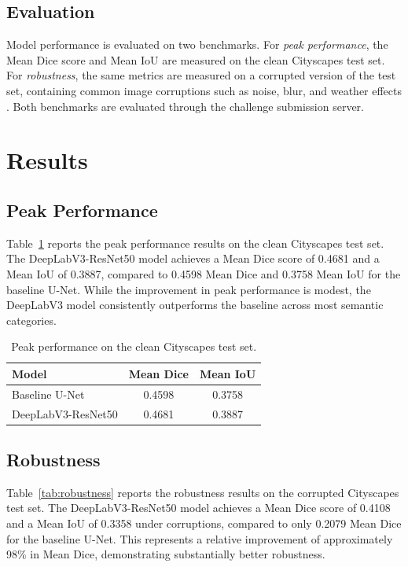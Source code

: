 \documentclass[conference]{IEEEtran}
\begin{document}
\subsection{Evaluation}
Model performance is evaluated on two benchmarks. For \textit{peak performance}, the Mean Dice score and Mean IoU are measured on the clean Cityscapes test set. For \textit{robustness}, the same metrics are measured on a corrupted version of the test set, containing common image corruptions such as noise, blur, and weather effects \cite{hendrycks2019robustness}. Both benchmarks are evaluated through the challenge submission server.


\section{Results}

\subsection{Peak Performance}

Table~\ref{tab:peak} reports the peak performance results on the clean Cityscapes test set. The DeepLabV3-ResNet50 model achieves a Mean Dice score of 0.4681 and a Mean IoU of 0.3887, compared to 0.4598 Mean Dice and 0.3758 Mean IoU for the baseline U-Net. While the improvement in peak performance is modest, the DeepLabV3 model consistently outperforms the baseline across most semantic categories.

\begin{table}[h]
\centering
\caption{Peak performance on the clean Cityscapes test set.}
\label{tab:peak}
\begin{tabular}{lcc}
\toprule
Model & Mean Dice & Mean IoU \\
\midrule
Baseline U-Net & 0.4598 & 0.3758 \\
DeepLabV3-ResNet50 & 0.4681 & 0.3887 \\
\bottomrule
\end{tabular}
\end{table}

\subsection{Robustness}

Table~\ref{tab:robustness} reports the robustness results on the corrupted Cityscapes test set. The DeepLabV3-ResNet50 model achieves a Mean Dice score of 0.4108 and a Mean IoU of 0.3358 under corruptions, compared to only 0.2079 Mean Dice for the baseline U-Net. This represents a relative improvement of approximately 98\% in Mean Dice, demonstrating substantially better robustness.
\end{document}
